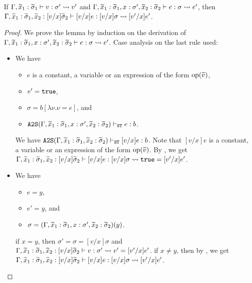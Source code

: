 \begin{lemma}
\label{lem:sub}
If \(\Gamma,\widetilde{x}_1:\widetilde{\sigma}_1 \vdash v : \sigma' \leadsto v'\) and
\(\Gamma,\widetilde{x}_1:\widetilde{\sigma}_1,x:\sigma',\widetilde{x}_2:\widetilde{\sigma}_2 \vdash e : \sigma \leadsto e'\), then
\(\Gamma,\widetilde{x}_1:\widetilde{\sigma}_1,\widetilde{x}_2:[v/x]\widetilde{\sigma}_2 \vdash [v/x]e : [v/x]\sigma \leadsto [v'/x]e'\).
\end{lemma}
\begin{proof}
We prove the lemma by induction on the derivation of
\(\Gamma,\widetilde{x}_1:\widetilde{\sigma}_1,x:\sigma',\widetilde{x}_2:\widetilde{\sigma}_2 \vdash e : \sigma \leadsto e'\).
Case analysis on the last rule used:
\begin{itemize}
\item[] 
We have
\begin{itemize}
\item $e$ is a constant, a variable or an expression of the form \(\mathrm{op}(\widetilde{v})\),
\item \(e'=\mathtt{true}\),
\item \(\sigma=b[\lambda \nu.\nu=e]\), and
\item \(\mathtt{A2S}(\Gamma,\widetilde{x}_1:\widetilde{\sigma}_1,x:\sigma',\widetilde{x}_2:\widetilde{\sigma}_2) \vdash_{\mathtt{ST}} e:b\).
\end{itemize}
We have \(\mathtt{A2S}(\Gamma,\widetilde{x}_1:\widetilde{\sigma}_1,\widetilde{x}_2:\widetilde{\sigma}_2) \vdash_{\mathtt{ST}} [v/x]e:b\).
Note that \([v/x]e\) is a constant, a variable or an expression of the form \(\mathrm{op}(\widetilde{v})\).
By , we get
\(\Gamma,\widetilde{x}_1:\widetilde{\sigma}_1,\widetilde{x}_2:[v/x]\widetilde{\sigma}_2 \vdash [v/x]e : [v/x]\sigma \leadsto \mathtt{true}=[v'/x]e'\).

\item[] 
We have
\begin{itemize}
\item \(e=y\),
\item \(e'=y\), and
\item \(\sigma=(\Gamma,\widetilde{x}_1:\widetilde{\sigma}_1,x:\sigma',\widetilde{x}_2:\widetilde{\sigma}_2)(y)\).
\end{itemize}
if \(x=y\), then \(\sigma'=\sigma=[v/x]\sigma\) and
\(\Gamma,\widetilde{x}_1:\widetilde{\sigma}_1,\widetilde{x}_2:[v/x]\widetilde{\sigma}_2 \vdash v : \sigma' \leadsto v'=[v'/x]e'\).
if \(x \neq y\), then by , we get
\(\Gamma,\widetilde{x}_1:\widetilde{\sigma}_1,\widetilde{x}_2:[v/x]\widetilde{\sigma}_2 \vdash [v/x]e : [v/x]\sigma \leadsto [v'/x]e'\).


\end{itemize}
\end{proof}
